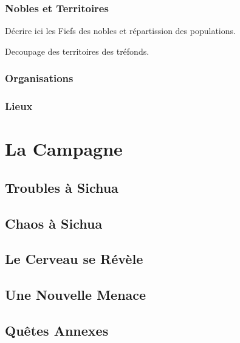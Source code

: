 \documentclass{dd}
\begin{document}
\section{Nobles et Territoires}



Décrire ici les Fiefs des nobles et répartission des populations.

Decoupage des territoires des tréfonds.

\section{Organisations}



\section{Lieux}




\part{La Campagne}


\chapter{Troubles à Sichua}



\chapter{Chaos à Sichua}


\chapter{Le Cerveau se Révèle}


\chapter{Une Nouvelle Menace}


\chapter{Quêtes Annexes}
\end{document}
